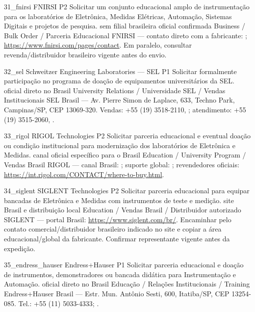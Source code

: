 \ContatoEmpresa
  {31_fnirsi}
  {FNIRSI}
  {P2}
  {Solicitar um conjunto educacional amplo de instrumentação para os laboratórios de Eletrônica, Medidas Elétricas, Automação, Sistemas Digitais e projetos de pesquisa.}
  {sem filial brasileira oficial confirmada}
  {Business / Bulk Order / Parceria Educacional}
  {FNIRSI — contato direto com a fabricante: ; \url{https://www.fnirsi.com/pages/contact}. Em paralelo, consultar revenda/distribuidor brasileiro vigente antes do envio.}

\ContatoEmpresa
  {32_sel}
  {Schweitzer Engineering Laboratories — SEL}
  {P1}
  {Solicitar formalmente participação no programa de doação de equipamentos universitários da SEL.}
  {oficial direto no Brasil}
  {University Relations / Universidade SEL / Vendas Institucionais}
  {SEL Brasil — Av. Pierre Simon de Laplace, 633, Techno Park, Campinas/SP, CEP 13069-320. Vendas: +55 (19) 3518-2110, ; atendimento: +55 (19) 3515-2060, .}

\ContatoEmpresa
  {33_rigol}
  {RIGOL Technologies}
  {P2}
  {Solicitar parceria educacional e eventual doação ou condição institucional para modernização dos laboratórios de Eletrônica e Medidas.}
  {canal oficial específico para o Brasil}
  {Education / University Program / Vendas Brasil}
  {RIGOL — canal Brasil: ; suporte global: ; revendedores oficiais: \url{https://int.rigol.com/CONTACT/where-to-buy.html}.}

\ContatoEmpresa
  {34_siglent}
  {SIGLENT Technologies}
  {P2}
  {Solicitar parceria educacional para equipar bancadas de Eletrônica e Medidas com instrumentos de teste e medição.}
  {site Brasil e distribuição local}
  {Education / Vendas Brasil / Distribuidor autorizado}
  {SIGLENT — portal Brasil: \url{https://www.siglent.com/br/}. Encaminhar pelo contato comercial/distribuidor brasileiro indicado no site e copiar a área educacional/global da fabricante. Confirmar representante vigente antes da expedição.}

\ContatoEmpresa
  {35_endress_hauser}
  {Endress+Hauser}
  {P1}
  {Solicitar parceria educacional e doação de instrumentos, demonstradores ou bancada didática para Instrumentação e Automação.}
  {oficial direto no Brasil}
  {Educação / Relações Institucionais / Training}
  {Endress+Hauser Brasil — Estr. Mun. Antônio Sesti, 600, Itatiba/SP, CEP 13254-085. Tel.: +55 (11) 5033-4333; .}

